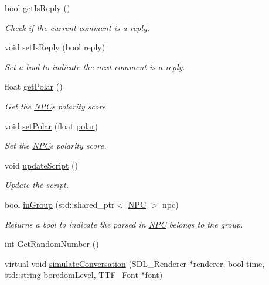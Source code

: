 \begin{DoxyCompactItemize}
bool \hyperlink{class_base___group_a878700b51979d0acd3eb83cdfa4c0449}{get\+Is\+Reply} ()
\begin{DoxyCompactList}\small\item\em Check if the current comment is a reply. \end{DoxyCompactList}\item 
void \hyperlink{class_base___group_aebe2b457ac29aefcc7105908a61460c8}{set\+Is\+Reply} (bool reply)
\begin{DoxyCompactList}\small\item\em Set a bool to indicate the next comment is a reply. \end{DoxyCompactList}\item 
float \hyperlink{class_base___group_a57cd8ebf1eee11eab80816ee87223f36}{get\+Polar} ()
\begin{DoxyCompactList}\small\item\em Get the \hyperlink{class_n_p_c}{N\+PC}\textquotesingle{}s polarity score. \end{DoxyCompactList}\item 
void \hyperlink{class_base___group_a36ef627854f502a064fca8aea44a22fe}{set\+Polar} (float \hyperlink{class_base___group_a0c2dfa52ac107ec9564bfc42917e8ce0}{polar})
\begin{DoxyCompactList}\small\item\em Set the \hyperlink{class_n_p_c}{N\+PC}\textquotesingle{}s polarity score. \end{DoxyCompactList}\item 
void \hyperlink{class_base___group_a8c16feac44492aa68f4ee758662892c8}{update\+Script} ()
\begin{DoxyCompactList}\small\item\em Update the script. \end{DoxyCompactList}\item 
bool \hyperlink{class_base___group_a216c3f44a7ce30482ae933fc410d86a4}{in\+Group} (std\+::shared\+\_\+ptr$<$ \hyperlink{class_n_p_c}{N\+PC} $>$ npc)
\begin{DoxyCompactList}\small\item\em Returns a bool to indicate the parsed in \hyperlink{class_n_p_c}{N\+PC} belongs to the group. \end{DoxyCompactList}\item 
int \hyperlink{class_base___group_a3864a2806457151363344051f2814389}{Get\+Random\+Number} ()
\item 
virtual void \hyperlink{class_base___group_aa5080b6388c5974394bf326ce80bfa91}{simulate\+Conversation} (S\+D\+L\+\_\+\+Renderer $\ast$renderer, bool time, std\+::string boredom\+Level, T\+T\+F\+\_\+\+Font $\ast$font)

\end{DoxyCompactItemize}
